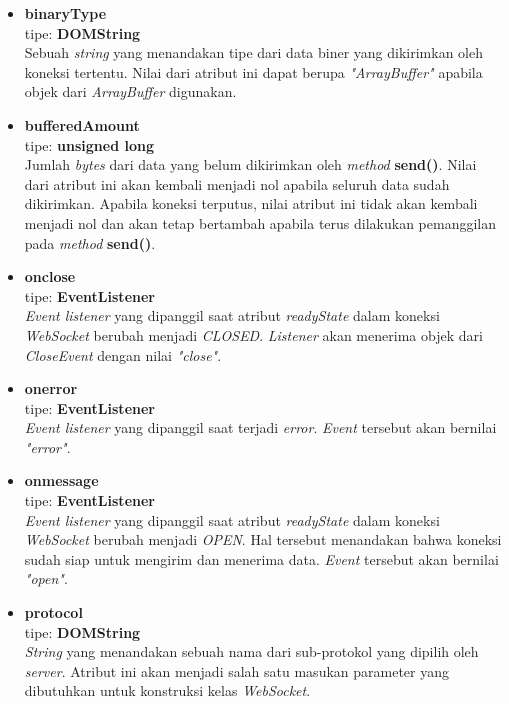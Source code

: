 \begin{itemize}
	\item \textbf{binaryType} \\ tipe: \textbf{DOMString} \\ Sebuah \textit{string} yang menandakan tipe dari data biner yang dikirimkan oleh koneksi tertentu. Nilai dari atribut ini dapat berupa \textit{"ArrayBuffer"} apabila objek dari \textit{ArrayBuffer} digunakan.
	
	\item \textbf{bufferedAmount} \\ tipe: \textbf{unsigned long} \\ Jumlah \textit{bytes} dari data yang belum dikirimkan oleh \textit{method} \textbf{send()}. Nilai dari atribut ini akan kembali menjadi nol apabila seluruh data sudah dikirimkan. Apabila koneksi terputus, nilai atribut ini tidak akan kembali menjadi nol dan akan tetap bertambah apabila terus dilakukan pemanggilan pada \textit{method} \textbf{send()}.
	
	\item \textbf{onclose} \\ tipe: \textbf{EventListener} \\ \textit{Event listener} yang dipanggil saat atribut \textit{readyState} dalam koneksi \textit{WebSocket} berubah menjadi \textit{CLOSED}. \textit{Listener} akan menerima objek dari \textit{CloseEvent} dengan nilai \textit{"close"}.
	
	\item \textbf{onerror} \\ tipe: \textbf{EventListener} \\ \textit{Event listener} yang dipanggil saat terjadi \textit{error}. \textit{Event} tersebut akan bernilai \textit{"error"}.
	
	\item \textbf{onmessage} \\ tipe: \textbf{EventListener} \\ \textit{Event listener} yang dipanggil saat atribut \textit{readyState} dalam koneksi \textit{WebSocket} berubah menjadi \textit{OPEN}. Hal tersebut menandakan bahwa koneksi sudah siap untuk mengirim dan menerima data. \textit{Event} tersebut akan bernilai \textit{"open"}.
	
	\item \textbf{protocol} \\ tipe: \textbf{DOMString} \\ \textit{String} yang menandakan sebuah nama dari sub-protokol yang dipilih oleh \textit{server}. Atribut ini akan menjadi salah satu masukan parameter yang dibutuhkan untuk konstruksi kelas \textit{WebSocket}.
	

\end{itemize}
